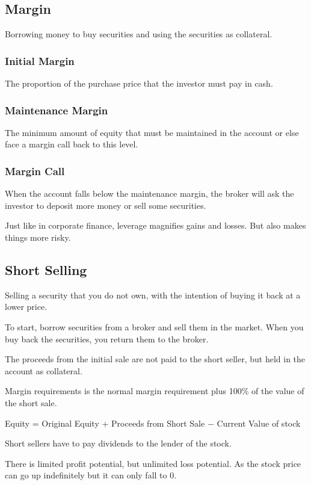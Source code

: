 \subsection{Margin}
Borrowing money to buy securities and using the securities as collateral.

\subsubsection{Initial Margin}
The proportion of the purchase price that the investor must pay in cash.

\subsubsection{Maintenance Margin}
The minimum amount of equity that must be maintained in the account or else face a margin call back to this level.

\subsubsection{Margin Call}
When the account falls below the maintenance margin, the broker will ask the investor to deposit more money or sell some securities.

Just like in corporate finance, leverage magnifies gains and losses. But also makes things more risky.

\subsection{Short Selling}
Selling a security that you do not own, with the intention of buying it back at a lower price.

To start, borrow securities from a broker and sell them in the market.
When you buy back the securities, you return them to the broker.

The proceeds from the initial sale are not paid to the short seller, but held in the account as collateral.

Margin requirements is the normal margin requirement plus 100\% of the value of the short sale.

Equity = Original Equity + Proceeds from Short Sale $-$ Current Value of stock

Short sellers have to pay dividends to the lender of the stock.

There is limited profit potential, but unlimited loss potential. As the stock price can go up indefinitely but it can only fall to 0.

